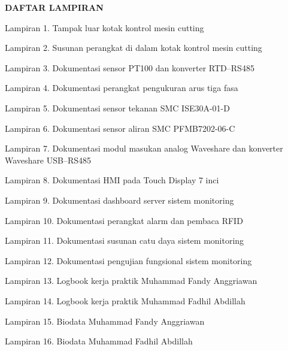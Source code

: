 \cleardoublepage
{}
{}
\begin{center}
{\FontJudulHalaman\bfseries DAFTAR LAMPIRAN\par}
\end{center}
\vspace{12pt}
\noindent Lampiran 1. Tampak luar kotak kontrol mesin cutting\dotfill\pageref{lamp:1}\par\vspace{4pt}
\noindent Lampiran 2. Susunan perangkat di dalam kotak kontrol mesin cutting\dotfill\pageref{lamp:2}\par\vspace{4pt}
\noindent Lampiran 3. Dokumentasi sensor PT100 dan konverter RTD--RS485\dotfill\pageref{lamp:3}\par\vspace{4pt}
\noindent Lampiran 4. Dokumentasi perangkat pengukuran arus tiga fasa\dotfill\pageref{lamp:4}\par\vspace{4pt}
\noindent Lampiran 5. Dokumentasi sensor tekanan SMC ISE30A-01-D\dotfill\pageref{lamp:5}\par\vspace{4pt}
\noindent Lampiran 6. Dokumentasi sensor aliran SMC PFMB7202-06-C\dotfill\pageref{lamp:6}\par\vspace{4pt}
\noindent Lampiran 7. Dokumentasi modul masukan analog Waveshare dan konverter Waveshare USB--RS485\dotfill\pageref{lamp:7}\par\vspace{4pt}
\noindent Lampiran 8. Dokumentasi HMI pada Touch Display 7 inci\dotfill\pageref{lamp:8}\par\vspace{4pt}
\noindent Lampiran 9. Dokumentasi dashboard server sistem monitoring\dotfill\pageref{lamp:9}\par\vspace{4pt}
\noindent Lampiran 10. Dokumentasi perangkat alarm dan pembaca RFID\dotfill\pageref{lamp:10}\par\vspace{4pt}
\noindent Lampiran 11. Dokumentasi susunan catu daya sistem monitoring\dotfill\pageref{lamp:11}\par\vspace{4pt}
\noindent Lampiran 12. Dokumentasi pengujian fungsional sistem monitoring\dotfill\pageref{lamp:12}\par\vspace{4pt}
\noindent Lampiran 13. Logbook kerja praktik Muhammad Fandy Anggriawan\dotfill\pageref{lamp:13}\par\vspace{4pt}
\noindent Lampiran 14. Logbook kerja praktik Muhammad Fadhil Abdillah\dotfill\pageref{lamp:14}\par\vspace{4pt}
\noindent Lampiran 15. Biodata Muhammad Fandy Anggriawan\dotfill\pageref{lamp:15}\par\vspace{4pt}
\noindent Lampiran 16. Biodata Muhammad Fadhil Abdillah\dotfill\pageref{lamp:16}\par\vspace{4pt}
